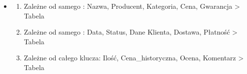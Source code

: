 \documentclass[letterpaper,10pt,polish]{sphinxmanual}
\begin{document}
\sphinxAtStartPar
{}
\begin{itemize}
\item {} \begin{description}
\begin{enumerate}
%
\item {} 
\sphinxAtStartPar
Zależne od samego : Nazwa, Producent, Kategoria, Cena, Gwarancja \sphinxhyphen{}\textgreater{} Tabela 

\item {} 
\sphinxAtStartPar
Zależne od samego : Data, Status, Dane Klienta, Dostawa, Płatność \sphinxhyphen{}\textgreater{} Tabela 

\item {} 
\sphinxAtStartPar
Zależne od całego klucza: Ilość, Cena\_historyczna, Ocena, Komentarz \sphinxhyphen{}\textgreater{} Tabela 

\end{enumerate}

\end{description}

\end{itemize}
\end{document}
